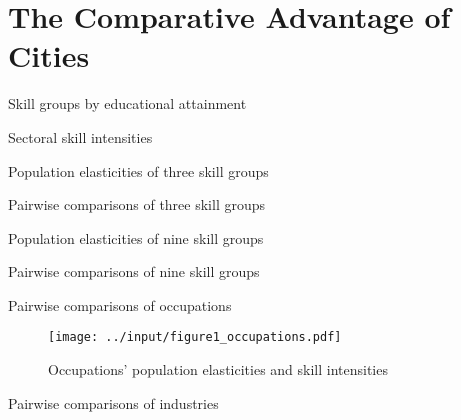 \documentclass[11pt]{article}
\begin{document}
\section{The Comparative Advantage of Cities}

\begin{table} \caption{Skill groups by educational attainment}
\resizebox{\textwidth}{!}{}
\label{tab:shares}
\end{table}

\begin{table} \caption{Sectoral skill intensities}
\resizebox{\textwidth}{!}{}
\label{tab:skillintensities}
\end{table}

\begin{table} \caption{Population elasticities of three skill groups}

\label{tab:edu3_popelast}
\end{table}

\begin{table} \caption{Pairwise comparisons of three skill groups}
	\resizebox{\textwidth}{!}{}
\label{tab:edu3_pairwise}
\end{table}

\begin{table} \caption{Population elasticities of nine skill groups}

\label{tab:edu9_popelast}
\end{table}
\begin{table} \caption{Pairwise comparisons of nine skill groups}
	\resizebox{\textwidth}{!}{}
\label{tab:edu9_pairwise}
\end{table}

\begin{table} \caption{Pairwise comparisons of occupations}
	\resizebox{\textwidth}{!}{}
\label{tab:occ_pairwise}
\end{table}

\begin{figure} \caption{Occupations' population elasticities and skill intensities} \begin{center}
\texttt{[image: ../input/figure1\_occupations.pdf]}
\label{fig:occ_popelast}
\end{center}\end{figure}

\begin{table} \caption{Pairwise comparisons of industries}
	\resizebox{\textwidth}{!}{}
\label{tab:ind_pairwise}
\end{table}
\end{document}

